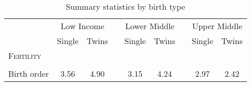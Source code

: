 \documentclass{article}[11pt,subeqn]
\begin{document}
\begin{spacing}{1.5}


  \begin{table}[ht]
\caption{Summary statistics by birth type}
\label{tab:missing}
\vspace{-7mm}
\begin{center}
\begin{tabular}{lccp{5mm}ccp{5mm}cc} 
\toprule
  & \multicolumn{2}{c}{Low Income} & & \multicolumn{2}{c}{Lower Middle}& & \multicolumn{2}{c}{Upper Middle} \\ \cmidrule(r){2-3} \cmidrule(r){5-6} \cmidrule(r){8-9} 
 & Single & Twins && Single & Twins&& Single & Twins \\ \midrule
\textsc{Fertility} & & &&&&&& \\																
\begin{footnotesize}\end{footnotesize}	&	\begin{footnotesize}\end{footnotesize}	&	\begin{footnotesize}\end{footnotesize}	&	\begin{footnotesize}\end{footnotesize} &	\begin{footnotesize}\end{footnotesize}	&	\begin{footnotesize}\end{footnotesize}	&	\begin{footnotesize}\end{footnotesize} &	\begin{footnotesize}\end{footnotesize}	&	\begin{footnotesize}\end{footnotesize}		\\
Birth order	&	3.56	&	4.90	&	&	3.15	&	4.24	&	&	2.97	&	2.42		\\

\end{tabular}
\end{center}
\end{table}
\end{spacing}
\end{document}
